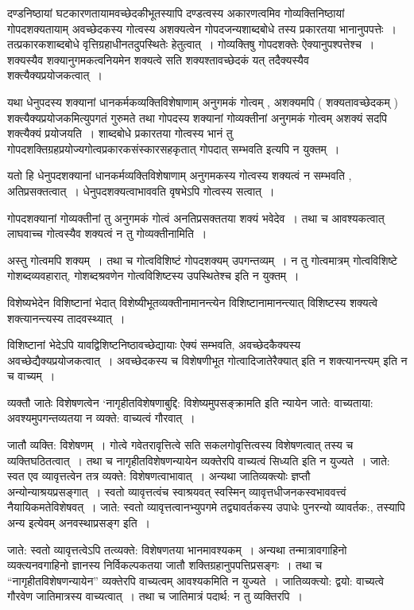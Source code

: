 {दण्डनिष्ठायां घटकारणतायामवच्छेदकीभूतस्यापि दण्डत्वस्य अकारणत्वमिव गोव्यक्तिनिष्ठायां गोपदशक्यतायाम् अवच्छेदकस्य गोत्वस्य अशक्यत्वेन गोपदजन्यशाब्दबोधे तस्य प्रकारतया भानानुपपत्तेः~। तत्प्रकारकशाब्दबोधे वृत्तिग्रहाधीनतदुपस्थितेः हेतुत्वात्~। गोव्यक्तिषु गोपदशक्तेः ऐक्यानुपश्पत्तेश्च~। शक्यस्यैव शक्यानुगमकत्वनियमेन शक्यत्वे सति शक्यश्तावच्छेदकं यत् तदैक्यस्यैव शक्त्यैक्यप्रयोजकत्वात्~। 

यथा धेनुपदस्य शक्यानां धानकर्मकव्यक्तिविशेषाणाम् अनुगमकं गोत्वम् , अशक्यमपि ( शक्यतावच्छेदकम् ) शक्त्यैक्यप्रयोजकमित्युपगतं गुरुमते तथा गोपदस्य शक्यानां गोव्यक्तीनां अनुगमकं गोत्वम् अशक्यं सदपि शक्त्यैक्यं प्रयोजयति~। शाब्दबोधे प्रकारतया गोत्वस्य भानं तु गोपदशक्तिग्रहप्रयोज्यगोत्वप्रकारकसंस्कारसहकृतात् गोपदात् सम्भवति इत्यपि न युक्तम्~। 

यतो हि धेनुपदशक्यानां धानकर्मव्यक्तिविशेषाणाम् अनुगमकस्य गोत्वस्य शक्यत्वं न सम्भवति , अतिप्रसक्तत्वात्~। धेनुपदशक्यत्वाभाववति वृषभेऽपि गोत्वस्य सत्वात्~। 

गोपदशक्यानां गोव्यक्तीनां तु अनुगमकं गोत्वं अनतिप्रसक्ततया शक्यं भवेदेव~। तथा च आवश्यकत्वात् लाघवाच्च गोत्वस्यैव शक्यत्वं न तु गोव्यक्तीनामिति~। 

अस्तु गोत्वमपि शक्यम्~। तथा च गोत्वविशिष्टं गोपदशक्यम् उपगन्तव्यम्~। न तु गोत्वमात्रम् गोत्वविशिष्टे गोशब्दव्यवहारात्, गोशब्दश्रवणेन गोत्वविशिष्टस्य उपस्थितेश्च इति न युक्तम्~। 

विशेष्यभेदेन विशिष्टानां भेदात् विशेष्यीभूतव्यक्तीनामानन्त्येन विशिष्टानामानन्त्यात् विशिष्टस्य शक्यत्वे शक्त्यानन्त्यस्य तादवस्थ्यात्~। 

विशिष्टानां भेदेऽपि यावद्विशिष्टनिष्ठावच्छेद्यायाः ऐक्यं सम्भवति, अवच्छेदकैक्यस्य अवच्छेद्यैक्यप्रयोजकत्वात्~। अवच्छेदकस्य च विशेषणीभूत गोत्वादिजातेरैक्यात् इति न शक्त्यानन्त्यम् इति न च वाच्यम्~। 

व्यक्तौ जातेः विशेषणत्वेन ‘नागृहीतविशेषणाबुद्दि: विशेष्यमुपसङ्क्रामति इति न्यायेन जाते: वाच्यताया: अवश्यमुपगन्तव्यतया न व्यक्ते: वाच्यत्वं गौरवात्~। 

जातौ व्यक्ति: विशेषणम्~। गोत्वे गवेतरावृत्तित्वे सति सकलगोवृत्तित्वस्य विशेषणत्वात् तस्य च व्यक्तिघठितत्वात्~। तथा च नागृहीतविशेषणन्यायेन व्यक्तेरपि वाच्यत्वं सिध्यति इति न युज्यते~। जाते: स्वत एव व्यावृत्तत्वेन तत्र व्यक्ते: विशेषणत्वाभावात्~। अन्यथा जातिव्यक्त्योः ज्ञप्तौ अन्योन्याश्रयप्रसङ्गात्~। स्वतो व्यावृत्तत्वंच स्वाश्रयवत् स्वस्मिन् व्यावृत्तधीजनकस्वभाववत्त्वं नैयायिकमतेविशेषवत्~। जाते: स्वतो व्यावृत्तत्वानभ्युपगमे तद्व्यावर्तकस्य उपाधेः पुनरन्यो व्यावर्तक:, तस्यापि अन्य इत्येवम् अनवस्थाप्रसङ्ग इति~। 

जाते: स्वतो व्यावृत्तत्वेऽपि तत्व्यक्ते: विशेषणतया भानमावश्यकम्~। अन्यथा तन्मात्रावगाहिनो व्यक्त्यनवगाहिनो ज्ञानस्य निर्विकल्पकतया जातौ शक्तिग्रहानुपपत्तिप्रसङ्गः~। तथा च “नागृहीतविशेषणन्यायेन” व्यक्तेरपि वाच्यत्वम् आवश्यकमिति न युज्यते~। जातिव्यक्त्यो: द्वयो: वाच्यत्वे गौरवेण जातिमात्रस्य वाच्यत्वात्~। तथा च जातिमात्रं पदार्थ: न तु व्यक्तिरपि~। 

}

